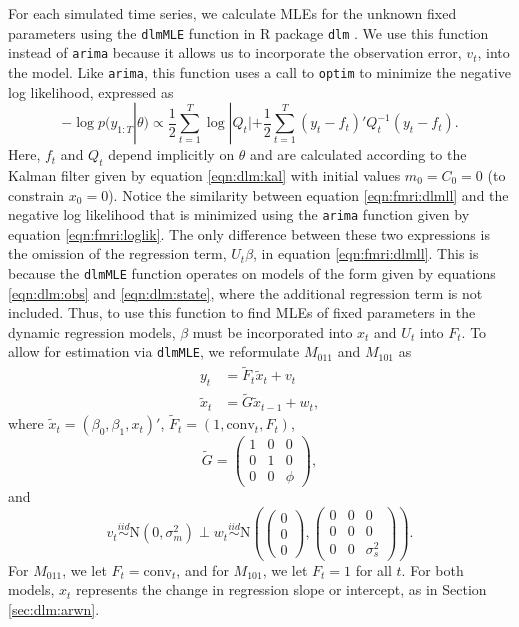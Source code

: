 For each simulated time series, we calculate MLEs for the unknown fixed parameters using the {\tt dlmMLE} function in R package {\tt dlm} \citep{petris:camp:2009:dynamic}. We use this function instead of {\tt arima} because it allows us to incorporate the observation error, $v_t$, into the model. Like {\tt arima}, this function uses a call to {\tt optim} to minimize the negative log likelihood, expressed as
\begin{equation}
-\log p(y_{1:T}|\theta) \propto \frac{1}{2}\sum_{t=1}^T \log |Q_t| + \frac{1}{2}\sum_{t=1}^T (y_t-f_t)'Q_t^{-1}(y_t-f_t). \label{eqn:fmri:dlmll}
\end{equation}
Here, $f_t$ and $Q_t$ depend implicitly on $\theta$ and are calculated according to the Kalman filter given by equation \eqref{eqn:dlm:kal} with initial values $m_0 = C_0 = 0$ (to constrain $x_0 = 0$). Notice the similarity between equation \eqref{eqn:fmri:dlmll} and the negative log likelihood that is minimized using the {\tt arima} function given by equation \eqref{eqn:fmri:loglik}. The only difference between these two expressions is the omission of the regression term, $U_t\beta$, in equation \eqref{eqn:fmri:dlmll}. This is because the {\tt dlmMLE} function operates on models of the form given by equations \eqref{eqn:dlm:obs} and \eqref{eqn:dlm:state}, where the additional regression term is not included. Thus, to use this function to find MLEs of fixed parameters in the dynamic regression models, $\beta$ must be incorporated into $x_t$ and $U_t$ into $F_t$. To allow for estimation via {\tt dlmMLE}, we reformulate $M_{011}$ and $M_{101}$ as
\begin{align}
y_t &= \tilde{F}_t\tilde{x}_t + v_t \label{eqn:dlmmle:obs} \\
\tilde{x}_t &= \tilde{G}\tilde{x}_{t-1} + w_t, \label{eqn:dlmmle:state}
\end{align}
where $\tilde{x}_t = (\beta_0,\beta_1,x_t)'$, $\tilde{F}_t = (1,\mbox{conv}_t,F_t)$,
\[\tilde{G} = \left(\begin{array}{ccc} 1 & 0 & 0 \\ 0 & 1 & 0 \\ 0 & 0 & \phi\end{array}\right), \]
and \[v_t \stackrel{iid}{\sim} \mbox{N}(0,\sigma^2_m) \perp w_t \stackrel{iid}{\sim} \mbox{N}\left(\left(\begin{array}{c} 0 \\ 0 \\ 0 \end{array}\right), \left(\begin{array}{ccc} 0 & 0 & 0 \\ 0 & 0 & 0 \\ 0 & 0 & \sigma^2_s \end{array}\right)\right).\]
For $M_{011}$, we let $F_t = \mbox{conv}_t$, and for $M_{101}$, we let $F_t = 1$ for all $t$. For both models, $x_t$ represents the change in regression slope or intercept, as in Section \eqref{sec:dlm:arwn}.

